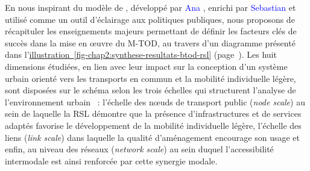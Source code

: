 \begin{refsegment}
En nous inspirant du modèle de , développé par \textcolor{blue}{Ana} \textcolor{blue}{\textcite[12]{gil_sola_negotiating_2019}}, enrichi par \textcolor{blue}{Sebastian} \textcolor{blue}{\textcite[8-9]{seisenberger_engaging_2023}} et utilisé comme un outil d'éclairage aux politiques publiques, nous proposons de récapituler les enseignements majeurs permettant de définir les facteurs clés de succès dans la mise en œuvre du \acrshort{M-TOD}, au travers d'un diagramme présenté dans l'\hyperref[fig-chap2:synthese-resultats-btod-rsl]{illustration~\ref{fig-chap2:synthese-resultats-btod-rsl}} (page~\pageref{fig-chap2:synthese-resultats-btod-rsl}). Les huit dimensions étudiées, en lien avec leur impact sur la conception d'un système urbain orienté vers les transports en commun et la mobilité individuelle légère, sont disposées sur le schéma selon les trois échelles qui structurent l'analyse de l'environnement urbain \textcolor{blue}{\autocite[294]{zhang_built_2023}}~: l'échelle des nœuds de transport public (\textsl{node scale}) au sein de laquelle la \acrshort{RSL} démontre que la présence d'infrastructures et de services adaptés favorise le développement de la mobilité individuelle légère, l'échelle des liens (\textsl{link scale}) dans laquelle la qualité d'aménagement encourage son usage et enfin, au niveau des réseaux (\textsl{network scale}) au sein duquel l'accessibilité intermodale est ainsi renforcée par cette synergie modale.%


\end{refsegment}
